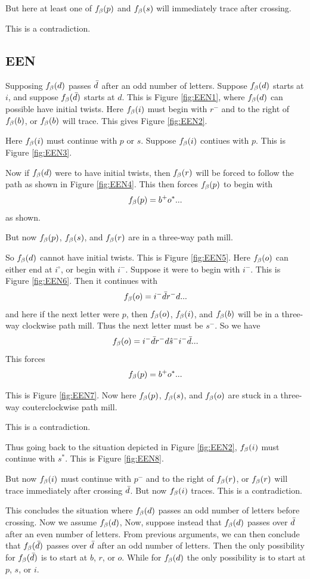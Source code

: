 But here at least one of $f_\beta(p)$ and $f_\beta(s)$ will immediately trace after crossing.

This is a contradiction.

\subsection{EEN}\label{EEN}
Supposing $f_\beta(d)$ passes $\bar{d}$ after an odd number of letters. Suppose $f_\beta(d)$ starts at $i$, and suppose $f_\beta(\bar{d})$ starts at $d$. This is Figure \ref{fig:EEN1}, where $f_\beta(d)$ can possible have initial twists. Here $f_\beta(i)$ must begin with $r^-$ and to the right of $f_\beta(b)$, or $f_\beta(b)$ will trace. This gives Figure \ref{fig:EEN2}.

Here $f_\beta(i)$ must continue with $p$ or $s$. Suppose $f_\beta(i)$ contiues with $p$. This is Figure \ref{fig:EEN3}.

Now if $f_\beta(d)$ were to have initial twists, then $f_\beta(r)$ will be forced to follow the path as shown in Figure \ref{fig:EEN4}. This then forces $f_\beta(p)$ to begin with 
\[
f_\beta(p) = b^+ o^*...
\]
as shown.

But now $f_\beta(p)$, $f_\beta(s)$, and $f_\beta(r)$ are in a three-way path mill.

So $f_\beta(d)$ cannot have initial twists. This is Figure \ref{fig:EEN5}. Here $f_\beta(o)$ can either end at $i^\circ$, or begin with $i^-$. Suppose it were to begin with $i^-$. This is Figure \ref{fig:EEN6}. Then it continues with 
\[
f_\beta(o) = i^- \bar{d} r^- d...
\]
and here if the next letter were $p$, then $f_\beta(o)$, $f_\beta(i)$, and $f_\beta(b)$ will be in a three-way clockwise path mill. Thus the next letter must be $s^-$. So we have
\[
f_\beta(o) = i^- \bar{d} r^- d \hat{s}^- i^- \bar{d}...
\]
This forces
\[
f_\beta(p) = b^+ o^*...
\]

This is Figure \ref{fig:EEN7}. Now here $f_\beta(p)$, $f_\beta(s)$, and $f_\beta(o)$ are stuck in a three-way couterclockwise path mill.

This is a contradiction. 

Thus going back to the situation depicted in Figure \ref{fig:EEN2}, $f_\beta(i)$ must continue with $s^*$. This is Figure \ref{fig:EEN8}.

But now $f_\beta(i)$ must continue with $p^-$ and to the right of $f_\beta(r)$, or $f_\beta(r)$ will trace immediately after crossing $\bar{d}$. But now $f_\beta(i)$ traces. This is a contradiction.


This concludes the situation where $f_\beta(d)$ passes an odd number of letters before crossing. Now we assume $f_\beta(d)$, Now, suppose instead that $f_\beta(d)$ passes over $\bar{d}$ after an even number of letters. From previous arguments, we can then
conclude that $f_\beta(\bar{d})$ passes over $\bar{d}$ after an odd number of letters. Then the only possibility for $f_\beta(\bar{d})$ is to start at $b$, $r$, or $o$. While for $f_\beta(d)$ the only possibility is to start at $p$, $s$, or $i$.

